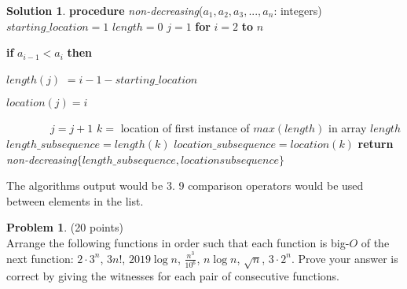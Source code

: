 \documentclass{article}
\theoremstyle{definition}
\newtheorem{problem}{Problem}
\newtheorem*{solution}{Solution}
\begin{document}
\begin{solution}
\item \textbf{procedure} \textit{non-decreasing}(\textit{$%
a_{1},a_{2},a_{3},...,a_{n}$}: integers)\newline
$starting\_location=1$\newline
$length=0$\newline
$j=1$\newline
\textbf{for} $i=2$ \textbf{to} $n$

\qquad \textbf{if} $a_{i-1}<a_{i}$ \textbf{then}

\qquad \qquad $length(j)$ $=i-1-starting\_location$

\qquad \qquad $location(j)=i$

$\qquad \qquad j=j+1$\newline
$k=$ location of first instance of $max(length)$ in array $length$\newline
$length\_subsequence=length(k)$\newline
$location\_subsequence=location(k)$\newline
\textbf{return} \textit{non-decreasing}$\{\mathit{length%
\_subsequence,locationsubsequence}\}$\newline

The algorithms output would be $3$. 9 comparison operators would be used between elements in the list.
\end{solution}


\newpage

\begin{problem} (20 points)\\
Arrange the following functions in order such that each function is big-$O$ of the next function:  $2\cdot3^n$, $3n!$, $2019\log{n}$, $\displaystyle \frac{n^3}{10^6}$, $n\log{n}$,  $\sqrt{n}$, $3\cdot2^n$.  Prove your answer is correct by giving the witnesses for each pair of consecutive functions.
\end{problem}
\end{document}

